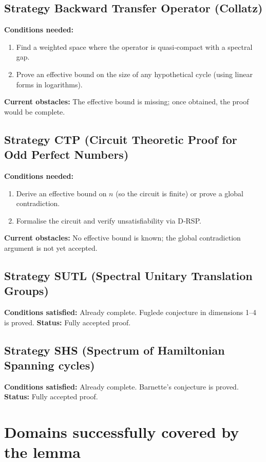 \documentclass[11pt,a4paper]{article}
\begin{document}
\subsection{Strategy Backward Transfer Operator (Collatz)}
\textbf{Conditions needed:}
\begin{enumerate}
\item Find a weighted space where the operator is quasi‑compact with a spectral gap.
\item Prove an effective bound on the size of any hypothetical cycle (using linear forms in logarithms).
\end{enumerate}
\textbf{Current obstacles:} The effective bound is missing; once obtained, the proof would be complete.

\subsection{Strategy CTP (Circuit Theoretic Proof for Odd Perfect Numbers)}
\textbf{Conditions needed:}
\begin{enumerate}
\item Derive an effective bound on \(n\) (so the circuit is finite) or prove a global contradiction.
\item Formalise the circuit and verify unsatisfiability via D‑RSP.
\end{enumerate}
\textbf{Current obstacles:} No effective bound is known; the global contradiction argument is not yet accepted.

\subsection{Strategy SUTL (Spectral Unitary Translation Groups)}
\textbf{Conditions satisfied:} Already complete. Fuglede conjecture in dimensions 1–4 is proved.
\textbf{Status:} Fully accepted proof.

\subsection{Strategy SHS (Spectrum of Hamiltonian Spanning cycles)}
\textbf{Conditions satisfied:} Already complete. Barnette's conjecture is proved.
\textbf{Status:} Fully accepted proof.

\section{Domains successfully covered by the lemma}
\end{document}
